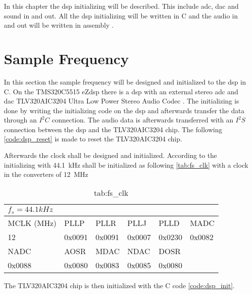 \label{ch:disinit}
In this chapter the \gls{dsp} initializing will be described. This include \gls{adc}, \gls{dac} and sound in and out. All the \gls{dsp} initializing will be written in C and the audio in and out will be written in assembly \citep{slaa557}. 

\section{Sample Frequency}
In this section the sample frequency will be designed and initialized to the \gls{dsp} in C. 
On the TMS320C5515 eZdsp there is a \gls{dsp} with an external stereo \gls{adc} and \gls{dac} TLV320AIC3204 Ultra Low Power Stereo Audio Codec \citep{TLV320AIC3204}. The initializing is done by writing the initializing code on the \gls{dsp} and afterwards transfer the data through an $I^2C$ connection. The audio data is afterwards transferred with an $I^2S$ connection between the \gls{dsp} and the TLV320AIC3204 chip.
The following \autoref{code:dsp_reset} is made to reset the TLV320AIC3204 chip.


Afterwards the clock shall be designed and initialized. According to \citep{slaa557} the initializing with \SI{44.1}{\kilo\hertz} shall be initialized as following \autoref{tab:fs_clk} with a clock in the converters of \SI{12}{\mega\hertz}

\begin{table}[]
\centering
\caption{tab:fs_clk}
\label{tab:fs_clk}
\begin{tabular}{|l|l|l|l|l|l|}
\hline
\multicolumn{6}{|l|}{$f_s=44.1kHz$}           \\ \hline
MCLK (MHz) & PLLP & PLLR & PLLJ & PLLD & MADC \\ \hline
12         & 0x0091    & 0x0091    & 0x0007    & 0x0230  & 0x0082    \\ \hline
NADC       & AOSR & MDAC & NDAC & DOSR &      \\ \hline
0x0088          & 0x0080  & 0x0083    & 0x0085    & 0x0080  &      \\ \hline
\end{tabular}
\end{table}


The TLV320AIC3204 chip is then initialized with the C code  \autoref{code:dsp_init}.

